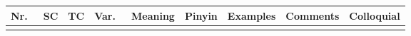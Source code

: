 \documentclass[fontsize=12pt,
			 parskip=full,
			 a4paper,
			 landscape,
			 pagesize,
			 DIV=16]{scrreprt}
\begin{document}
\begin{longtable}{|r|>{\large}c|>{\large}c|>{\large}c|p{2.5cm}|p{1.5cm}|>{\large}l|p{7cm}|p{2.5cm}|}
\hline
\bfseries Nr.\ & \normalsize\bfseries SC & \normalsize\bfseries TC & \normalsize\bfseries Var.\ & \bfseries Meaning & \bfseries Pinyin & \normalsize\bfseries Examples & \bfseries Comments & \bfseries Colloquial \\ \hline
\endhead
\hline
\endfoot

\end{longtable}
\end{document}
